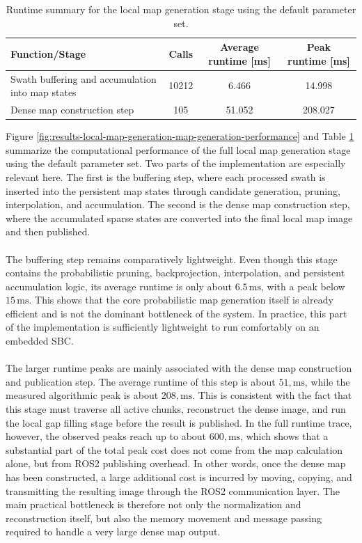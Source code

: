 \begin{table}[H]
    \centering
    \caption{Runtime summary for the local map generation stage using the default parameter set.}
    \label{tab:results-local-map-generation-map-generation-runtime-default}
    \begin{tabular}{l c c c}
        \hline
        Function/Stage & Calls & Average runtime [ms] & Peak runtime [ms] \\
        \hline
        Swath buffering and accumulation into map states & 10212 & 6.466 & 14.998 \\
        Dense map construction step & 105 & 51.052 & 208.027 \\
        \hline
    \end{tabular}
\end{table}
\noindent
Figure \ref{fig:results-local-map-generation-map-generation-performance} and Table \ref{tab:results-local-map-generation-map-generation-runtime-default} summarize the computational performance of the full local map generation stage using the default parameter set. Two parts of the implementation are especially relevant here. The first is the buffering step, where each processed swath is inserted into the persistent map states through candidate generation, pruning, interpolation, and accumulation. The second is the dense map construction step, where the accumulated sparse states are converted into the final local map image and then published.
\\ \\
The buffering step remains comparatively lightweight. Even though this stage contains the probabilistic pruning, backprojection, interpolation, and persistent accumulation logic, its average runtime is only about $6.5\,\mathrm{ms}$, with a peak below $15\,\mathrm{ms}$. This shows that the core probabilistic map generation itself is already efficient and is not the dominant bottleneck of the system. In practice, this part of the implementation is sufficiently lightweight to run comfortably on an embedded SBC.
\\ \\
The larger runtime peaks are mainly associated with the dense map construction and publication step. The average runtime of this step is about $51,\mathrm{ms}$, while the measured algorithmic peak is about $208,\mathrm{ms}$. This is consistent with the fact that this stage must traverse all active chunks, reconstruct the dense image, and run the local gap filling stage before the result is published. In the full runtime trace, however, the observed peaks reach up to about $600,\mathrm{ms}$, which shows that a substantial part of the total peak cost does not come from the map calculation alone, but from ROS2 publishing overhead. In other words, once the dense map has been constructed, a large additional cost is incurred by moving, copying, and transmitting the resulting image through the ROS2 communication layer. The main practical bottleneck is therefore not only the normalization and reconstruction itself, but also the memory movement and message passing required to handle a very large dense map output.
